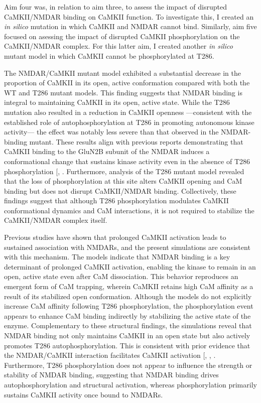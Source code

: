 \documentclass[
  11pt,
  letterpaper,
]{scrreprt}
\begin{document}
Aim four was, in relation to aim three, to assess the impact of
disrupted CaMKII/NMDAR binding on CaMKII function. To investigate this,
I created an \emph{in silico} mutation in which CaMKII and NMDAR cannot
bind. Similarly, aim five focused on asessing the impact of disrupted
CaMKII phosphorylation on the CaMKII/NMDAR complex. For this latter aim,
I created another \emph{in silico} mutant model in which CaMKII cannot
be phosphorylated at T286.

The NMDAR/CaMKII mutant model exhibited a substantial decrease in the
proportion of CaMKII in its open, active conformation compared with both
the WT and T286 mutant models. This finding suggests that NMDAR binding
is integral to maintaining CaMKII in its open, active state. While the
T286 mutation also resulted in a reduction in CaMKII openness
---consistent with the established role of autophosphorylation at T286
in promoting autonomous kinase activity--- the effect was notably less
severe than that observed in the NMDAR-binding mutant. These results
align with previous reports demonstrating that CaMKII binding to the
GluN2B subunit of the NMDAR induces a conformational change that
sustains kinase activity even in the absence of T286 phosphorylation
{[},
\citeproc{ref-cook2022CaMKIIb}{213}{]}. Furthermore, analysis of the
T286 mutant model revealed that the loss of phosphorylation at this site
alters CaMKII opening and CaM binding but does not disrupt CaMKII/NMDAR
binding. Collectively, these findings suggest that although T286
phosphorylation modulates CaMKII conformational dynamics and CaM
interactions, it is not required to stabilize the CaMKII/NMDAR complex
itself.

Previous studies have shown that prolonged CaMKII activation leads to
sustained association with NMDARs, and the present simulations are
consistent with this mechanism. The models indicate that NMDAR binding
is a key determinant of prolonged CaMKII activation, enabling the kinase
to remain in an open, active state even after CaM dissociation. This
behavior reproduces an emergent form of CaM trapping, wherein CaMKII
retains high CaM affinity as a result of its stabilized open
conformation. Although the models do not explicitly increase CaM
affinity following T286 phosphorylation, the phosphorylation event
appears to enhance CaM binding indirectly by stabilizing the active
state of the enzyme. Complementary to these structural findings, the
simulations reveal that NMDAR binding not only maintains CaMKII in an
open state but also actively promotes T286 autophosphorylation. This is
consistent with prior evidence that the NMDAR/CaMKII interaction
facilitates CaMKII activation {[},
,
\citeproc{ref-cook2022CaMKIIb}{213}{]}. Furthermore, T286
phosphorylation does not appear to influence the strength or stability
of NMDAR binding, suggesting that NMDAR binding drives
autophosphorylation and structural activation, whereas phosphorylation
primarily sustains CaMKII activity once bound to NMDARs.
\end{document}
